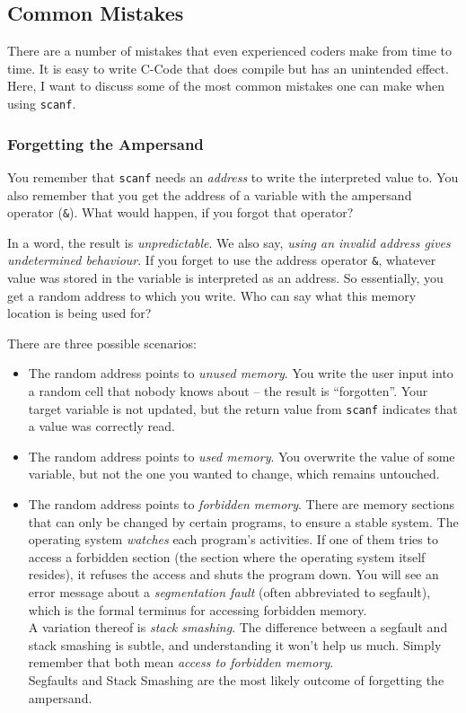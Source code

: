 \subsection{Common Mistakes} \label{sec:scanfMistakes}
There are a number of mistakes that even experienced coders make from time to time. It is easy to write C-Code that does compile but has an unintended effect. Here, I want to discuss some of the most common mistakes one can make when using \texttt{scanf}.

\subsubsection{Forgetting the Ampersand}
You remember that \texttt{scanf} needs an \emph{address} to write the interpreted value to. You also remember that you get the address of a variable with the ampersand operator (\texttt{\&}).  What would happen, if you forgot that operator?

In a word, the result is \emph{unpredictable}. We also say, \emph{using an invalid address gives undetermined behaviour}. If you forget to use the address operator \texttt{\&}, whatever value was stored in the variable is interpreted as an address. So essentially, you get a random address to which you write. Who can say what this memory location is being used for?

There are three possible scenarios:
\begin{itemize}
\item The random address points to \emph{unused memory}. You write the user input into a random cell that nobody knows about -- the result is \enquote{forgotten}.
	Your target variable is not updated, but the return value from \texttt{scanf} indicates that a value was correctly read.
\item The random address points to \emph{used memory}. You overwrite the value of some variable, but not the one you wanted to change, which remains untouched.
\item The random address points to \emph{forbidden memory}. There are memory sections that can only be changed by certain programs, to ensure a stable system. The operating system
	\emph{watches} each program's activities. If one of them tries to access a forbidden section (\eg the section where the operating system itself resides), it refuses the access and
	shuts the program down. You will see an error message about a \emph{segmentation fault} (often abbreviated to segfault), which is the formal terminus for accessing forbidden memory.\\
	A variation thereof is \emph{stack smashing}. The difference between a segfault and stack smashing is subtle, and understanding it won't help us much.
	Simply remember that both mean \emph{access to forbidden memory}.\\
	Segfaults and Stack Smashing are the most likely outcome of forgetting the ampersand.
\end{itemize}

